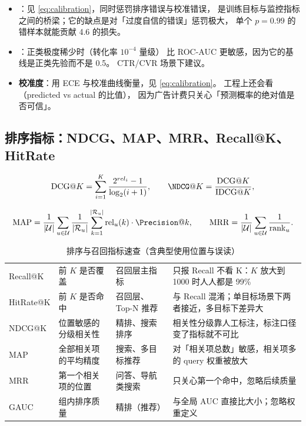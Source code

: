 \begin{itemize}
  \item {}：见 \cref{eq:calibration}，同时惩罚排序错误与校准错误，
        是训练目标与监控指标之间的桥梁；它的缺点是对「过度自信的错误」惩罚极大，
        单个 $p=0.99$ 的错样本就能贡献 4.6 的损失。
  \item {}：正类极度稀少时（转化率 $10^{-4}$ 量级）
        比 ROC-AUC 更敏感，因为它的基线是正类先验而不是 0.5。
        CTR/CVR 场景下建议。
  \item \textbf{校准度}：用 ECE 与校准曲线衡量，见 \cref{eq:calibration}。
        工程上还会看（predicted vs actual 的比值），
        因为广告计费只关心「预测概率的绝对值是否可信」。
\end{itemize}

\subsection{排序指标：NDCG、MAP、MRR、Recall@K、HitRate}

\begin{equation}
\text{DCG@}K = \sum_{i=1}^{K}\frac{2^{rel_i} - 1}{\log_2(i+1)},
\qquad
\NDCG@K = \frac{\text{DCG@}K}{\text{IDCG@}K} ,
\label{eq:ndcg}
\end{equation}

\begin{equation}
\MAP = \frac{1}{\abs{\mathcal{U}}}\sum_{u \in \mathcal{U}}\frac{1}{\abs{\mathcal{R}_u}}
\sum_{k=1}^{\abs{\mathcal{R}_u}} \text{rel}_u(k)\cdot \Precision@k ,
\qquad
\MRR = \frac{1}{\abs{\mathcal{U}}}\sum_{u \in \mathcal{U}} \frac{1}{\text{rank}_u} .
\label{eq:map-mrr}
\end{equation}

\begin{table}[htbp]
\centering
\caption{排序与召回指标速查（含典型使用位置与误读）}
\label{tab:rank-metrics}
\small
\begin{tabularx}{\textwidth}{L{2.0cm} L{1.9cm} L{2.6cm} Y}
\toprule
{} &  &  &  \\
\midrule
Recall@K & 前 $K$ 是否覆盖 & 召回层主指标 & 只报 Recall 不看 K：$K$ 放大到 1000 时人人都是 99\% \\
\addlinespace
HitRate@K & 前 $K$ 是否命中 & 召回层、Top-N 推荐 & 与 Recall 混淆；单目标场景下两者接近，多目标下差异大 \\
\addlinespace
NDCG@K & 位置敏感的分级相关性 & 精排、搜索排序 & 相关性分级靠人工标注，标注口径变了指标就不可比 \\
\addlinespace
MAP & 全部相关项的平均精度 & 搜索、多目标推荐 & 对「相关项总数」敏感，相关项多的 query 权重被放大 \\
\addlinespace
MRR & 第一个相关项的位置 & 问答、导航类搜索 & 只关心第一个命中，忽略后续质量 \\
\addlinespace
GAUC & 组内排序质量 & 精排（推荐） & 与全局 AUC 直接比大小；忽略权重定义 \\
\bottomrule
\end{tabularx}
\end{table}

